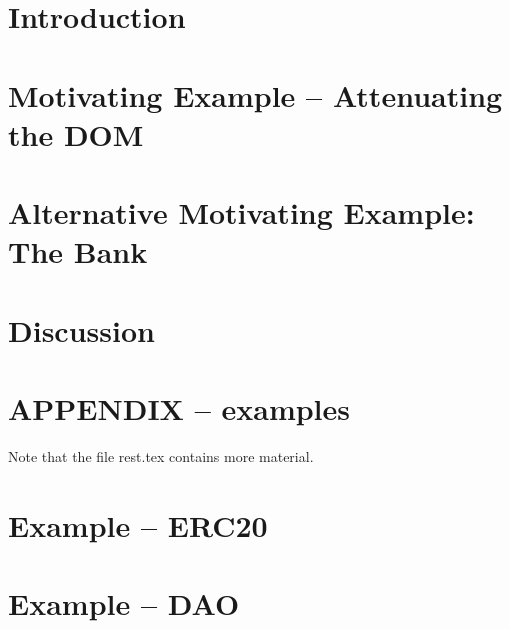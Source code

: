 \documentclass[acmsmall,screen]{acmart}
\begin{document}
\section{Introduction}




\section{Motivating Example -- Attenuating the DOM}
\label{sect:mitave:DOM}



\section{Alternative Motivating Example: The Bank}





\section{Discussion}
\label{sec:discussion} 





\section*{APPENDIX -- examples}
Note that the file rest.tex contains more material.

 

\appendix




\section{Example -- ERC20}


\section{Example -- DAO}

\end{document}
